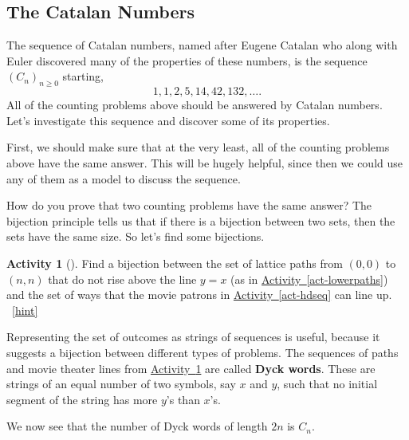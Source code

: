 \documentclass[10pt,]{book}
\newcommand{\terminology}[1]{\textbf{#1}}
\theoremstyle{plain}
\theoremstyle{definition}
\theoremstyle{definition}
\theoremstyle{definition}
\newtheorem{activity}[project]{Activity}
\numberwithin{equation}{chapter}
\begin{document}
\subsection[{The Catalan Numbers}]{The Catalan Numbers}\label{subsec-catalanseq}
\hypertarget{p-1008}{}%
The sequence of Catalan numbers, named after Eugene Catalan who along with Euler discovered many of the properties of these numbers, is the sequence \((C_n)_{n \ge 0}\) starting,%
\begin{equation*}
1, 1, 2, 5, 14, 42, 132, \ldots\text{.}
\end{equation*}
All of the counting problems above should be answered by Catalan numbers.  Let's investigate this sequence and discover some of its properties.%
\par
\hypertarget{p-1009}{}%
First, we should make sure that at the very least, all of the counting problems above have the same answer.  This will be hugely helpful, since then we could use any of them as a model to discuss the sequence.%
\par
\hypertarget{p-1010}{}%
How do you prove that two counting problems have the same answer?  The bijection principle tells us that if there is a bijection between two sets, then the sets have the same size.  So let's find some bijections.%
\begin{activity}[]\label{act-pathshdseq}
\hypertarget{p-1011}{}%
Find a bijection between the set of lattice paths from \((0,0)\) to \((n,n)\) that do not rise above the line \(y = x\) (as in \hyperref[act-lowerpaths]{Activity~\ref{act-lowerpaths}}) and the set of ways that the movie patrons in \hyperref[act-hdseq]{Activity~\ref{act-hdseq}} can line up.%
~\hfill{\tiny\hyperlink{a-178}{[hint]}\hypertarget{q-178}{}}\end{activity}
\hypertarget{p-1013}{}%
Representing the set of outcomes as strings of sequences is useful, because it suggests a bijection between different types of problems.  The sequences of paths and movie theater lines from \hyperref[act-pathshdseq]{Activity~\ref{act-pathshdseq}} are called \terminology{Dyck words}.  These are strings of an equal number of two symbols, say \(x\) and \(y\), such that no initial segment of the string has more \(y\)'s than \(x\)'s.%
\par
\hypertarget{p-1014}{}%
We now see that the number of Dyck words of length \(2n\) is \(C_n\).%
\end{document}

